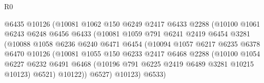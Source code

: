 \begin{lexlean}{R0}
\begin{coremodule}
                                  @6435
                                  @10126
                                  (@10081
                                    @1062
                                    @150
                                    @6249
                                    @2417
                                    @6433
                                    @2288
                                    (@10100
                                      @1061
                                      @6243
                                      @6248
                                      @6456
                                      @6433
                                      (@10081
                                        @1059
                                        @791
                                        @6241
                                        @2419
                                        @6454
                                        @3281
                                        (@10088
                                          @1058
                                          @6236
                                          @6240
                                          @6471
                                          @6454
                                          (@10094
                                            @1057
                                            @6217
                                            @6235
                                            @6378
                                            @6470
                                            @10126
                                            (@10081
                                              @1055
                                              @150
                                              @6233
                                              @2417
                                              @6468
                                              @2288
                                              (@10100
                                                @1054
                                                @6227
                                                @6232
                                                @6491
                                                @6468
                                                (@10196 @791 @6225 @2419 @6489 @3281 @10215 @10123)
                                                @6521)
                                              @10122))
                                          @6527)
                                        @10123)
                                      @6533)

\end{coremodule}
\end{lexlean}
